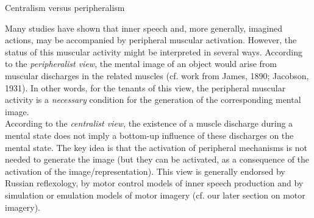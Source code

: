 \documentclass[a4paper,12pt,twoside,onecolumn,openright,final,oldfontcommands]{memoir}
\begin{document}
\vspace{2mm}

\begin{mybox}[label = centralism]{Centralism versus peripheralism}

Many studies have shown that inner speech and, more generally, imagined actions, may be accompanied by peripheral muscular activation. However, the status of this muscular activity might be interpreted in several ways. According to the \textit{peripheralist view}, the mental image of an object would arise from muscular discharges in the related muscles (cf. work from James, 1890; Jacobson, 1931). In other words, for the tenants of this view, the peripheral muscular activity is a \textit{necessary} condition for the generation of the corresponding mental image.\\

According to the \textit{centralist view}, the existence of a muscle discharge during a mental state does not imply a bottom-up influence of these discharges on the mental state. The key idea is that the activation of peripheral mechanisms is not needed to generate the image (but they can be activated, as a consequence of the activation of the image/representation). This view is generally endorsed by Russian reflexology, by motor control models of inner speech production and by simulation or emulation models of motor imagery (cf. our later section on motor imagery).

\end{mybox}
\end{document}
